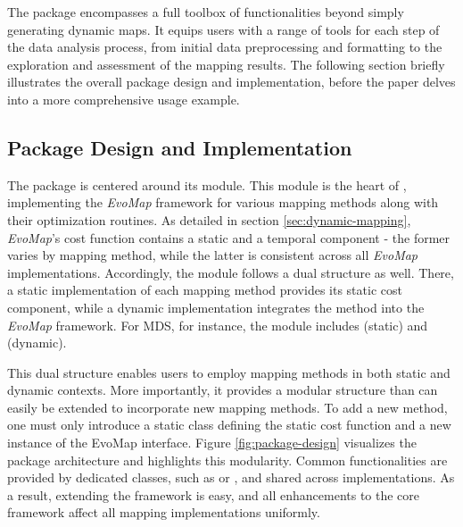 \documentclass[article]{jss}
\begin{document}
The  package encompasses a full toolbox of functionalities beyond simply generating dynamic maps. 
It equips users with a range of tools for each step of the data analysis process, from initial data preprocessing 
and formatting to the exploration and assessment of the mapping results. The following section briefly illustrates 
the overall package design and implementation, before the paper delves into a more comprehensive usage example. 

\subsection{Package Design and Implementation}

The  package is centered around its  module. This module is the heart of , 
implementing the \emph{EvoMap} framework for various mapping methods along with their optimization routines. 
As detailed in section \ref{sec:dynamic-mapping}, \emph{EvoMap}’s cost function contains a static and a temporal 
component - the former varies by mapping method, while the latter is consistent across all \emph{EvoMap} implementations. 
Accordingly, the  module follows a dual structure as well. There, a static implementation
of each mapping method provides its static cost component, while a dynamic implementation integrates the method
into the \emph{EvoMap} framework. For MDS, for instance, the  module includes  (static)
 and  (dynamic). 

This dual structure enables users to employ mapping methods in both static and dynamic contexts. More importantly, 
it provides a modular structure than can easily be extended to incorporate new mapping methods. To add a new method, 
one must only introduce a static class defining the static cost function and a new instance of the 
EvoMap  interface. Figure \ref{fig:package-design} visualizes the package architecture and highlights this 
modularity. Common functionalities are provided by dedicated classes, such as  or , and 
shared across implementations. As a result, extending the framework is easy, and all enhancements to the core 
framework affect all mapping implementations uniformly.
\end{document}
